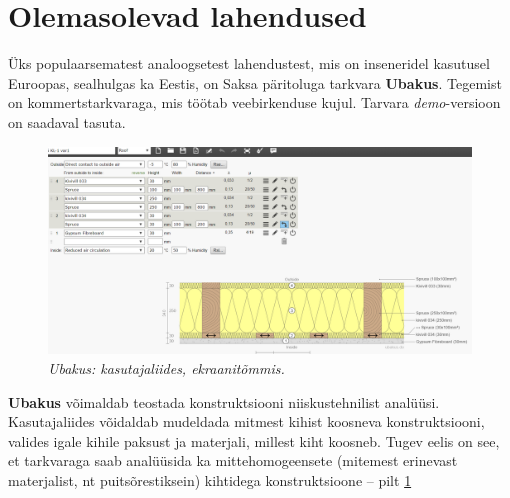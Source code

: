 \section{Olemasolevad lahendused}
Üks populaarsematest analoogsetest lahendustest, mis on inseneridel kasutusel Euroopas, sealhulgas ka Eestis, on Saksa päritoluga tarkvara \textbf{Ubakus}. 
Tegemist on kommertstarkvaraga, mis töötab veebirkenduse kujul. Tarvara \textit{demo}-versioon on saadaval tasuta.
\begin{figure}[ht]
    \centering
    \includegraphics[width=.8\textwidth]{figures/problem_statement/01_ubakus.png}
    \caption[Ubakus tarkvara katutajaliides, ekraanitõmmis]{\textit{Ubakus: kasutajaliides, ekraanitõmmis.}}
    \label{fig:ubakus_sample}
\end{figure}

\textbf{Ubakus} võimaldab teostada konstruktsiooni niiskustehnilist analüüsi. Kasutajaliides võidaldab 
mudeldada mitmest kihist koosneva konstruktsiooni, valides igale kihile paksust ja materjali, millest 
kiht koosneb. Tugev eelis on see, et tarkvaraga saab analüüsida ka mittehomogeensete (mitemest erinevast 
materjalist, nt puitsõrestiksein) kihtidega konstruktsioone -- pilt \ref{fig:ubakus_sample}

